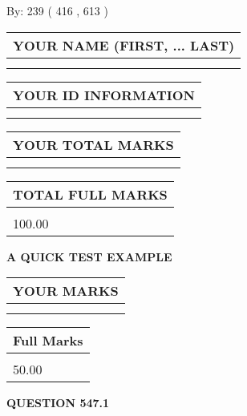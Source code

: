 \documentclass[12pt]{article}
\begin{document}
   
\hspace{1.0in} By: 
 239 ( 416 ,  613 )
   
   
   
   
\newpage 
\setcounter{page}{ 
   547001 } 
   
   
   
   
\noindent\begin{tabular}{|l|}
\hline
YOUR NAME (FIRST, ... LAST)  \\
\hline
 \\ 
 \\ 
\hline
\end{tabular}
\hspace{0.05in} \begin{tabular}{|l|}
\hline
 YOUR   ID   INFORMATION  \\
\hline
 \\ 
 \\ 
\hline
\end{tabular}
   
   
\vspace{0.2in}\noindent\begin{tabular}{|l|}
\hline
YOUR TOTAL MARKS  \\
\hline
 \\ 
 \\ 
\hline
\end{tabular}
\hspace{0.05in} \begin{tabular}{|l|}
\hline
TOTAL FULL MARKS  \\
\hline
 \\ 
100.00 \\
\hline
\end{tabular}
   
   
 \vspace{0.2in}
{\LARGE {\textbf{ A QUICK TEST EXAMPLE}}}
   
   
  
\vspace{0.2in}
  
\noindent\begin{tabular}{|l|}
\hline
 YOUR MARKS  \\
\hline
 \\ 
 \\ 
\hline
\end{tabular}
\hspace{0.05in} \begin{tabular}{|l|}
\hline
 Full Marks  \\
\hline
 \\ 
50.00 \\
\hline
\end{tabular}
{\textbf{\Large{QUESTION
547.1 
}}}
  
\end{document}
